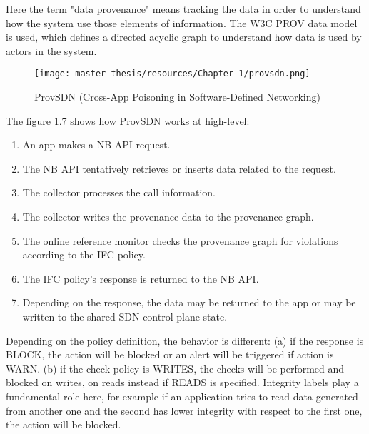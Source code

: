 \documentclass[a4paper,10pt]{memoir}
\begin{document}
Here the term "data provenance" means tracking the data in order to understand how the system use those elements of information. The W3C PROV data model is used, which defines a directed acyclic graph to understand how data is used by actors in the system.

\begin{figure}[h]
\caption{ProvSDN (Cross-App Poisoning in Software-Defined Networking)}
\label{fig:provsdn}
\texttt{[image: master-thesis/resources/Chapter-1/provsdn.png]}
\centering
\end{figure}

The figure 1.7 shows how ProvSDN works at high-level:
\begin{enumerate}
    \item An app makes a NB API request. 
    \item The NB API tentatively retrieves or inserts data related to the request.
    \item The collector processes the call information.
    \item The collector writes the provenance data to the provenance graph.
    \item The online reference monitor checks the provenance graph for violations according to the IFC policy.
    \item The IFC policy’s response is returned to the NB API.
    \item Depending on the response, the data may be returned to the app or may be written to the shared SDN control plane state.
\end{enumerate}


Depending on the policy definition, the behavior is different: (a) if the response is BLOCK, the action will be blocked or an alert will be triggered if action is WARN. (b) if the check policy is WRITES, the checks will be performed and blocked on writes, on reads instead if READS is specified. Integrity labels play a fundamental role here, for example if an application tries to read data generated from another one and the second has lower integrity with respect to the first one, the action will be blocked.

\medskip
\end{document}

